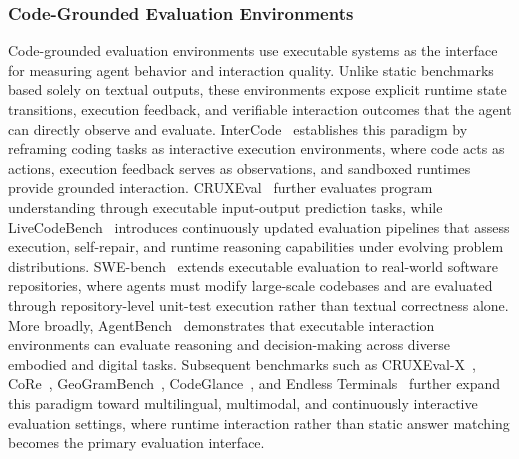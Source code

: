 \subsubsection{Code-Grounded Evaluation Environments}
Code-grounded evaluation environments use executable systems as
the interface for measuring agent behavior and interaction
quality.
Unlike static benchmarks based solely on textual outputs, these
environments expose explicit runtime state transitions, execution
feedback, and verifiable interaction outcomes that the agent
can directly observe and evaluate.
InterCode~\cite{yang2023intercode} establishes this paradigm by
reframing coding tasks as interactive execution environments,
where code acts as actions, execution feedback serves as
observations, and sandboxed runtimes provide grounded
interaction.
CRUXEval~\cite{gu2024cruxeval} further evaluates program
understanding through executable input-output prediction tasks,
while LiveCodeBench~\cite{jain2024livecodebench} introduces
continuously updated evaluation pipelines that assess execution,
self-repair, and runtime reasoning capabilities under evolving
problem distributions.
SWE-bench~\cite{jimenez2023swe} extends executable evaluation to
real-world software repositories, where agents must modify
large-scale codebases and are evaluated through repository-level
unit-test execution rather than textual correctness alone.
More broadly, AgentBench~\cite{liu2023agentbench} demonstrates
that executable interaction environments can evaluate reasoning
and decision-making across diverse embodied and digital tasks.
Subsequent benchmarks such as
CRUXEval-X~\cite{xu2025cruxeval},
CoRe~\cite{xie2025core},
GeoGramBench~\cite{luo2025geogrambench},
CodeGlance~\cite{wang2026codeglance}, and
Endless Terminals~\cite{gandhi2026endless} further expand this
paradigm toward multilingual, multimodal, and continuously
interactive evaluation settings, where runtime interaction rather
than static answer matching becomes the primary evaluation
interface.



